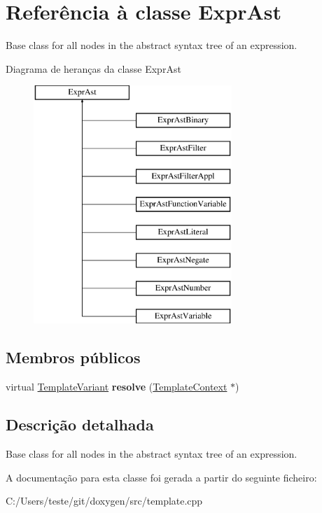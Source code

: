 \hypertarget{class_expr_ast}{\section{Referência à classe Expr\-Ast}
\label{class_expr_ast}
}


Base class for all nodes in the abstract syntax tree of an expression.  


Diagrama de heranças da classe Expr\-Ast\begin{figure}[H]
\begin{center}
\leavevmode
\includegraphics[height=9.000000cm]{class_expr_ast}
\end{center}
\end{figure}
\subsection*{Membros públicos}
\begin{DoxyCompactItemize}
\item 
\hypertarget{class_expr_ast_af33b31cdb1179449bc274eec57c73f39}{virtual \hyperlink{class_template_variant}{Template\-Variant} {\bfseries resolve} (\hyperlink{class_template_context}{Template\-Context} $\ast$)}\label{class_expr_ast_af33b31cdb1179449bc274eec57c73f39}

\end{DoxyCompactItemize}


\subsection{Descrição detalhada}
Base class for all nodes in the abstract syntax tree of an expression. 

A documentação para esta classe foi gerada a partir do seguinte ficheiro\-:\begin{DoxyCompactItemize}
\item 
C\-:/\-Users/teste/git/doxygen/src/template.\-cpp\end{DoxyCompactItemize}
